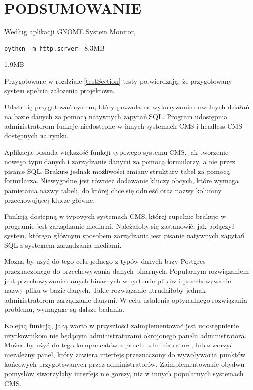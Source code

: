\section{PODSUMOWANIE}

Według aplikacji GNOME System Monitor, 

\verb|python -m http.server| - 8.3MB

1.9MB

\medspace

Przygotowane w rozdziale \ref{testSection} testy potwierdzają, że przygotowany
system spełnia założenia projektowe.

Udało się przygotować system, który pozwala na wykonywanie dowolnych działań na
bazie danych za pomocą natywnych zapytań SQL. Program udostępnia administratorom
funkcje niedostępne w innych systemach CMS i headless CMS dostępnych na rynku.

\medspace

Aplikacja posiada większość funkcji typowego systemu CMS, jak tworzenie nowego
typu danych i zarządzanie danymi za pomocą formularzy, a nie przez pisanie SQL.
Brakuje jednak możliwości zmiany struktury tabel za pomocą formularza.
Niewygodne jest również dodawanie kluczy obcych, które wymaga pamiętania nazwy
tabeli, do której chce się odnieść oraz nazwy kolumny przechowującej klucze
główne.

Funkcją dostępną w typowych systemach CMS, której zupełnie brakuje w programie
jest zarządzanie mediami. Należałoby się zastanowić, jak połączyć system,
którego głównym sposobem zarządzania jest pisanie natywnych zapytań SQL z
systemem zarządzania mediami.

Można by użyć do tego celu jednego z typów danych bazy Postgres przeznaczonego do
przechowywania danych binarnych. Popularnym rozwiązaniem jest przechowywanie
danych binarnych w systemie plików i przechowywanie nazwy pliku w bazie danych.
Takie rozwiązanie utrudniłoby jednak administratorom zarządzanie danymi. W celu
ustalenia optymalnego rozwiązania problemu, wymagane są dalsze badania.

Kolejną funkcją, jaką warto w przyszłości zaimplementować jest udostępnienie
użytkownikom nie będącym administratorami okrojonego panelu administratora.
Można by użyć do tego komponentów z panelu administratora, lub stworzyć
niezależny panel, który zawiera interfejs przeznaczony do wywoływania punktów
końcowych przygotowanych przez administratorów. Zaimplementowanie obydwu
pomysłów stworzyłoby interfejs nie gorszy, niż w innych popularnych systemach
CMS.

